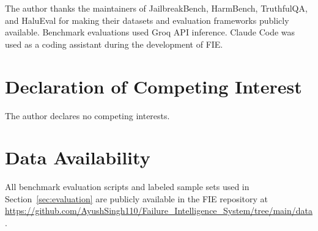 \documentclass[preprint,12pt,authoryear]{elsarticle}
\begin{document}
The author thanks the maintainers of JailbreakBench, HarmBench,
TruthfulQA, and HaluEval for making their datasets and evaluation
frameworks publicly available. Benchmark evaluations used Groq API
inference. Claude Code was used as a coding assistant during the
development of FIE.

\section*{Declaration of Competing Interest}

The author declares no competing interests.

\section*{Data Availability}

All benchmark evaluation scripts and labeled sample sets used in
Section~\ref{sec:evaluation} are publicly available in the FIE
repository at
\url{https://github.com/AyushSingh110/Failure_Intelligence_System/tree/main/data}.



\end{document}
